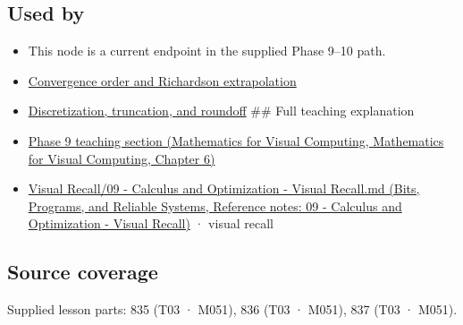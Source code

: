 \subsection{Used by}\label{appendix-80521eae6b71-used-by}

\begin{itemize}
\item
  This node is a current endpoint in the supplied Phase 9--10 path.
\item
  \hyperref[appendix-aca80b6bf17a]{Convergence order and Richardson extrapolation}
\item
  \hyperref[appendix-6b0648b2b8e8]{Discretization, truncation, and roundoff} \#\# Full teaching explanation
\item
  \href{../02-Mathematics-for-Visual-Computing/main.pdf\#nameddest=02-foundations-ii-ch022-integration-and-quadrature}{Phase 9 teaching section (Mathematics for Visual Computing, Mathematics for Visual Computing, Chapter 6)}
\item
  \href{../01-Bits-Programs-and-Reliable-Systems/main.pdf\#nameddest=appendix-adf48f5dc5c1}{Visual Recall/09 - Calculus and Optimization - Visual Recall.md (Bits, Programs, and Reliable Systems, Reference notes: 09 - Calculus and Optimization - Visual Recall)} · visual recall
\end{itemize}

\subsection{Source coverage}\label{appendix-80521eae6b71-source-coverage}

Supplied lesson parts: 835 (T03 · M051), 836 (T03 · M051), 837 (T03 · M051).
